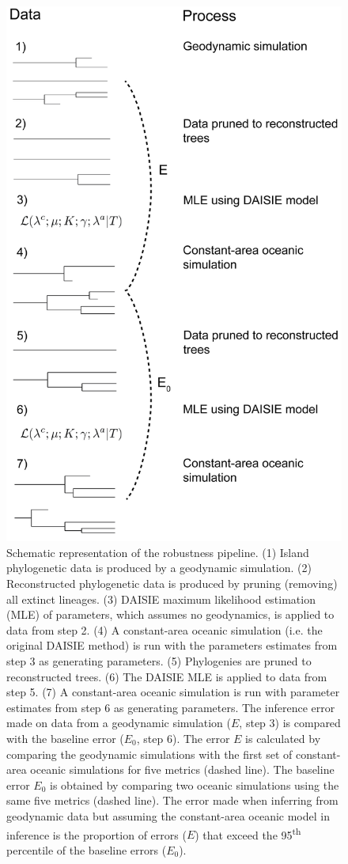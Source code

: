 \documentclass{article}
\begin{document}
\clearpage

\begin{figure}
    \includegraphics{JBI-21-0508_Fig2.png}
    \caption{Schematic representation of the robustness pipeline. (1) Island phylogenetic data is produced by a geodynamic simulation. (2) Reconstructed phylogenetic data is produced by pruning (removing) all extinct lineages. (3) DAISIE maximum likelihood estimation (MLE) of parameters, which assumes no geodynamics, is applied to data from step 2. (4) A constant-area oceanic simulation (i.e. the original DAISIE method) is run with the parameters estimates from step 3 as generating parameters. (5) Phylogenies are pruned to reconstructed trees. (6) The DAISIE MLE is applied to data from step 5. (7) A constant-area oceanic simulation is run with parameter estimates from step 6 as generating parameters. The inference error made on data from a geodynamic simulation ($E$, step 3) is compared with the baseline error ($E_0$, step 6). The error $E$ is calculated by comparing the geodynamic simulations with the first set of constant-area oceanic simulations for five metrics (dashed line). The baseline error $E_0$ is obtained by comparing two oceanic simulations using the same five metrics (dashed line). The error made when inferring from geodynamic data but assuming the constant-area oceanic model in inference is the proportion of errors ($E$) that exceed the 95\textsuperscript{th} percentile of the baseline errors ($E_0$).}

\end{figure}
\end{document}
